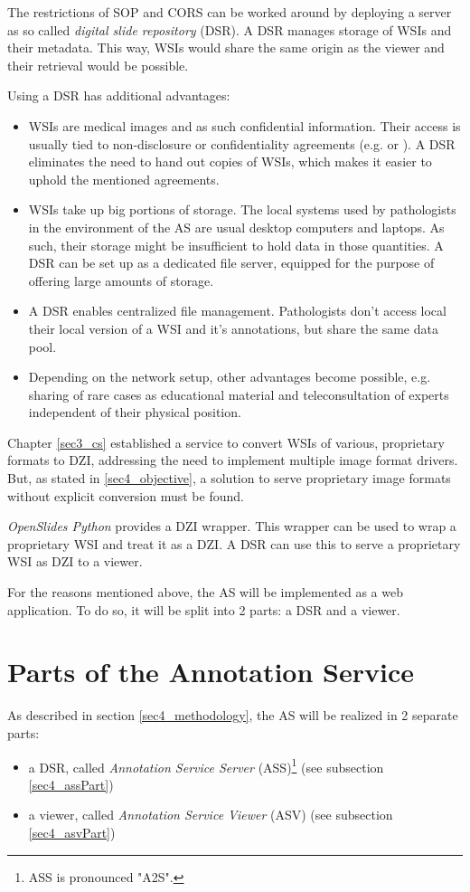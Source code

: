 The restrictions of SOP and CORS can be worked around by deploying a server as so called \emph{digital slide repository} (DSR). A DSR manages storage of WSIs and their metadata\cite{Cornish13}. This way, WSIs would share the same origin as the viewer and their retrieval would be possible.

Using a DSR has additional advantages: 
\begin{itemize}
	\item WSIs are medical images and as such confidential information. Their access is usually tied to non-disclosure or confidentiality agreements (e.g. \cite{COA} or \cite{USSanDiego}). A DSR eliminates the need to hand out copies of WSIs, which makes it easier to uphold the mentioned agreements.
	\item WSIs take up big portions of storage\cite{Singh11}. The local systems used by pathologists in the environment of the AS are usual desktop computers and laptops. As such, their storage might be insufficient to hold data in those quantities. A DSR can be set up as a dedicated file server, equipped for the purpose of offering large amounts of storage.
	\item A DSR enables centralized file management. Pathologists don't access local their local version of a WSI and it's annotations, but share the same data pool.
	\item Depending on the network setup, other advantages become possible, e.g. sharing of rare cases as educational material and teleconsultation of experts independent of their physical position\cite{Wilbur09}.
\end{itemize}

Chapter \ref{sec3_cs} established a service to convert WSIs of various, proprietary formats to DZI, addressing the need to implement multiple image format drivers. But, as stated in \ref{sec4_objective}, a solution to serve proprietary image formats without explicit conversion must be found.

\emph{OpenSlides Python} provides a DZI wrapper. This wrapper can be used to wrap a proprietary WSI and treat it as a DZI\cite{web:openslide}. A DSR can use this to serve a proprietary WSI as DZI to a viewer.

For the reasons mentioned above, the AS will be implemented as a web application. To do so, it will be split into 2 parts: a DSR and a viewer.


\section{Parts of the Annotation Service}
\label{sec4_parts}
As described in section \ref{sec4_methodology}, the AS will be realized in 2 separate parts:
\begin{itemize}
	\item a DSR, called \emph{Annotation Service Server} (ASS)\footnote{
		ASS is pronounced "A2S".
	} (see subsection \ref{sec4_assPart})
	\item a viewer, called \emph{Annotation Service Viewer} (ASV) (see subsection \ref{sec4_asvPart})
\end{itemize}

